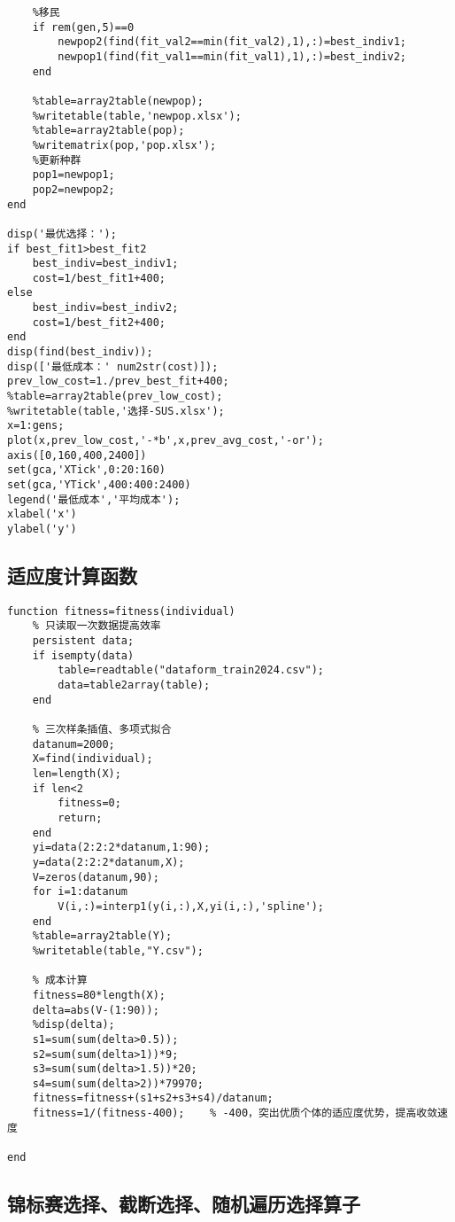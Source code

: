 \documentclass[withoutpreface,bwprint]{cumcmthesis} %
\begin{document}
\begin{appendices}
\begin{lstlisting}
    %移民
    if rem(gen,5)==0
        newpop2(find(fit_val2==min(fit_val2),1),:)=best_indiv1;
        newpop1(find(fit_val1==min(fit_val1),1),:)=best_indiv2;
    end

    %table=array2table(newpop);
    %writetable(table,'newpop.xlsx');
    %table=array2table(pop);
    %writematrix(pop,'pop.xlsx');
    %更新种群
    pop1=newpop1;
    pop2=newpop2;
end

disp('最优选择：');
if best_fit1>best_fit2
    best_indiv=best_indiv1;
    cost=1/best_fit1+400;
else
    best_indiv=best_indiv2;
    cost=1/best_fit2+400;
end
disp(find(best_indiv));
disp(['最低成本：' num2str(cost)]);
prev_low_cost=1./prev_best_fit+400;
%table=array2table(prev_low_cost);
%writetable(table,'选择-SUS.xlsx');
x=1:gens;
plot(x,prev_low_cost,'-*b',x,prev_avg_cost,'-or');
axis([0,160,400,2400])
set(gca,'XTick',0:20:160)
set(gca,'YTick',400:400:2400)
legend('最低成本','平均成本');
xlabel('x')
ylabel('y')
\end{lstlisting}

\subsection{适应度计算函数}

\begin{lstlisting}
function fitness=fitness(individual)
    % 只读取一次数据提高效率
    persistent data;
    if isempty(data)
        table=readtable("dataform_train2024.csv");
        data=table2array(table);
    end
    
    % 三次样条插值、多项式拟合
    datanum=2000;
    X=find(individual);
    len=length(X);
    if len<2
        fitness=0;
        return;
    end
    yi=data(2:2:2*datanum,1:90);
    y=data(2:2:2*datanum,X);
    V=zeros(datanum,90);
    for i=1:datanum
        V(i,:)=interp1(y(i,:),X,yi(i,:),'spline');
    end
    %table=array2table(Y);
    %writetable(table,"Y.csv");

    % 成本计算
    fitness=80*length(X);
    delta=abs(V-(1:90));
    %disp(delta);
    s1=sum(sum(delta>0.5));
    s2=sum(sum(delta>1))*9;
    s3=sum(sum(delta>1.5))*20;
    s4=sum(sum(delta>2))*79970;
    fitness=fitness+(s1+s2+s3+s4)/datanum;
    fitness=1/(fitness-400);    % -400，突出优质个体的适应度优势，提高收敛速度

end
\end{lstlisting}

\subsection{锦标赛选择、截断选择、随机遍历选择算子}


\end{appendices}
\end{document}
